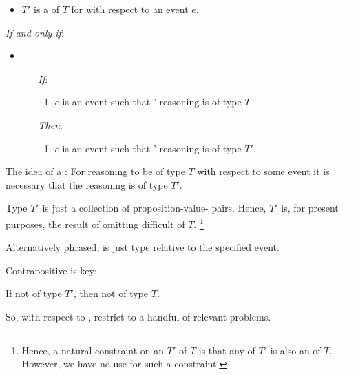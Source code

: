 \begin{note}
  \begin{definition}[\rotor{2}]
    \label{def:rotor}

    \begin{itemize}
    \item
      \(T'\) is a \emph{} of \(T\) for \vAgent{} with respect to an event \(e\).
    \end{itemize}

    \emph{If and only if}:

    \begin{itemize}
    \item

      \begin{itemize}
      \item[\emph{If}:]
        \begin{enumerate}[label=\alph*., ref=(\alph*), series=tRDef]
        \item
          \(e\) is an event such that \vAgent{}' reasoning is of type \(T\)
        \end{enumerate}
      \item[\emph{Then}:]
        \begin{enumerate}[label=\alph*., ref=(\alph*), resume*=tRDef]
        \item
          \(e\) is an event such that \vAgent{}' reasoning is of type \(T'\).
        \end{enumerate}
      \end{itemize}
    \end{itemize}
    \vspace{-\baselineskip}
  \end{definition}

  The idea of a \tRep{}:
  For reasoning to be of type \(T\) with respect to some event it is necessary that the reasoning is of type \(T'\).

  Type \(T'\) is just a collection of proposition-value-\pool{} pairs.
  Hence, \(T'\) is, for present purposes, the result of omitting difficult  of \(T\).%
  \footnote{
    Hence, a natural constraint on an \tRep{} \(T'\) of \(T\) is that any \tI{} of \(T'\) is also an \tI{} of \(T\).
    However, we have no use for such a constraint.
  }

  Alternatively phrased, \rotor{} is just type relative to the specified event.

  Contrapositive is key:

  If not of type \(T'\), then not of type \(T\).

  So, with respect to , restrict to a handful of relevant problems.
\end{note}

